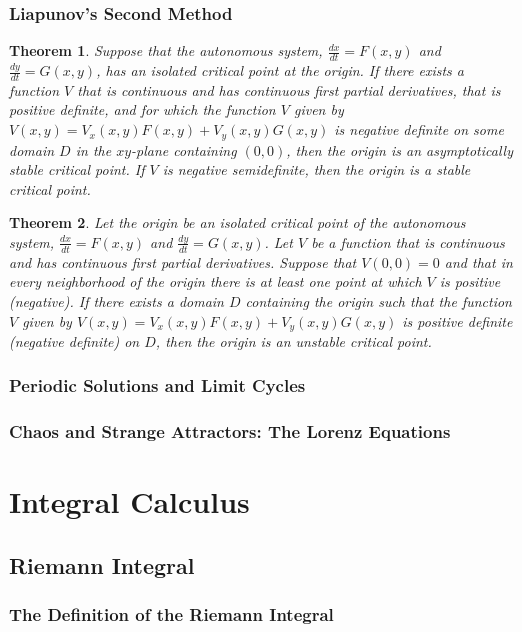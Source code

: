 \documentclass[10pt]{report}
\newtheorem{thm3}{Theorem}[subsection]
\begin{document}
\subsection{Liapunov's Second Method}
\begin{thm3}
Suppose that the autonomous system, $\frac{dx}{dt} = F(x,y)$ and $\frac{dy}{dt} = G(x,y)$, has an isolated critical point at the origin. If there exists a function $V$ that is continuous and has continuous first partial derivatives, that is positive definite, and for which the function $V$ given by $V(x,y) = V_x(x,y)F(x,y) + V_y(x,y)G(x,y)$ is negative definite on some domain $D$ in the $xy$-plane containing $(0,0)$, then the origin is an asymptotically stable critical point. If $V$ is negative semidefinite, then the origin is a stable critical point.
\end{thm3}
\begin{thm3}
Let the origin be an isolated critical point of the autonomous system, $\frac{dx}{dt} = F(x,y)$ and $\frac{dy}{dt} = G(x,y)$. Let $V$ be a function that is continuous and has continuous first partial derivatives. Suppose that $V(0,0)=0$ and that in every neighborhood of the origin there is at least one point at which $V$ is positive (negative). If there exists a domain $D$ containing the origin such that the function$V$ given by $V(x,y) = V_x(x,y)F(x,y) + V_y(x,y)G(x,y)$ is positive definite (negative definite) on $D$, then the origin is an unstable critical point.
\end{thm3}
\subsection{Periodic Solutions and Limit Cycles}
\subsection{Chaos and Strange Attractors: The Lorenz Equations}


\chapter{Integral Calculus}
\section{Riemann Integral}
\subsection{The Definition of the Riemann Integral}
\end{document}
